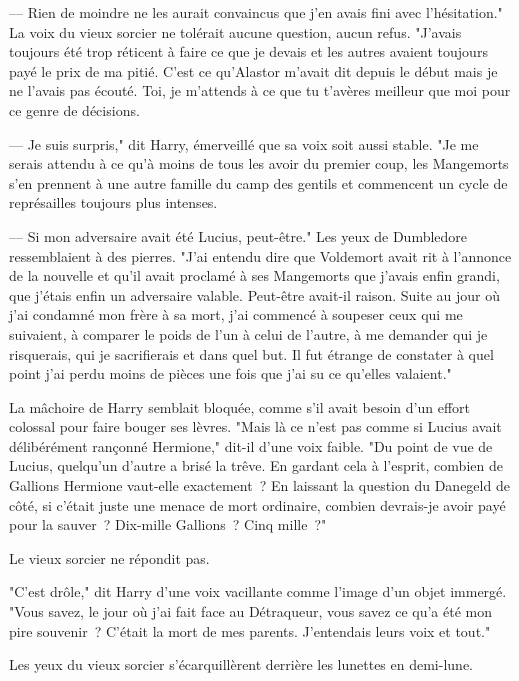 --- Rien de moindre ne les aurait convaincus que j'en avais fini avec l'hésitation." La voix du vieux sorcier ne tolérait aucune question, aucun refus. "J'avais toujours été trop réticent à faire ce que je devais et les autres avaient toujours payé le prix de ma pitié. C'est ce qu'Alastor m'avait dit depuis le début mais je ne l'avais pas écouté. Toi, je m'attends à ce que tu t'avères meilleur que moi pour ce genre de décisions.

--- Je suis surpris," dit Harry, émerveillé que sa voix soit aussi stable. "Je me serais attendu à ce qu'à moins de tous les avoir du premier coup, les Mangemorts s'en prennent à une autre famille du camp des gentils et commencent un cycle de représailles toujours plus intenses.

--- Si mon adversaire avait été Lucius, peut-être." Les yeux de Dumbledore ressemblaient à des pierres. "J'ai entendu dire que Voldemort avait rit à l'annonce de la nouvelle et qu'il avait proclamé à ses Mangemorts que j'avais enfin grandi, que j'étais enfin un adversaire valable. Peut-être avait-il raison. Suite au jour où j'ai condamné mon frère à sa mort, j'ai commencé à soupeser ceux qui me suivaient, à comparer le poids de l'un à celui de l'autre, à me demander qui je risquerais, qui je sacrifierais et dans quel but. Il fut étrange de constater à quel point j'ai perdu moins de pièces une fois que j'ai su ce qu'elles valaient."

La mâchoire de Harry semblait bloquée, comme s'il avait besoin d'un effort colossal pour faire bouger ses lèvres. "Mais là ce n'est pas comme si Lucius avait délibérément rançonné Hermione," dit-il d'une voix faible. "Du point de vue de Lucius, quelqu'un d'autre a brisé la trêve. En gardant cela à l'esprit, combien de Gallions Hermione vaut-elle exactement~? En laissant la question du Danegeld de côté, si c'était juste une menace de mort ordinaire, combien devrais-je avoir payé pour la sauver~? Dix-mille Gallions~? Cinq mille~?"

Le vieux sorcier ne répondit pas.

"C'est drôle," dit Harry d'une voix vacillante comme l'image d'un objet immergé. "Vous savez, le jour où j'ai fait face au Détraqueur, vous savez ce qu'a été mon pire souvenir~? C'était la mort de mes parents. J'entendais leurs voix et tout."

Les yeux du vieux sorcier s'écarquillèrent derrière les lunettes en demi-lune.

